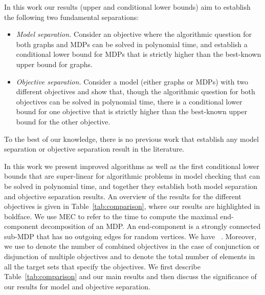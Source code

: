 \documentclass[11pt,letterpaper]{article}
\newif\iffullversion
\newcommand{\infull}[1]{\iffullversion #1\fi}
\begin{document}
\smallskip{} 
In this work our results (upper and conditional lower bounds) aim to establish 
the following two fundamental separations:

\begin{itemize}
\item {\em Model separation.} 
Consider an objective where the algorithmic question for both graphs and MDPs 
can be solved in polynomial time, and establish a conditional lower bound for 
MDPs that is strictly higher than the best-known upper bound for graphs. 
\infull{In other words, the conditional lower bound would separate the model of 
graphs and MDPs for problems (i.e., w.r.t.\ the objective) that can be solved in 
polynomial time.}

\item {\em Objective separation.} 
Consider a model (either graphs or MDPs) with two different objectives and 
show that, though the algorithmic question for both objectives can be solved in 
polynomial time, there is a conditional lower bound for one objective that 
is strictly higher than the best-known upper bound for the other objective.
\infull{In other words, the conditional lower bound would separate the two objectives 
w.r.t.\ the model though they both can be solved in polynomial time.}
\end{itemize}
To the best of our knowledge, there is no previous work that establish any 
model separation or objective separation result in the literature.

\smallskip{} 
In this work we present improved algorithms as well as 
the first conditional lower bounds that are super-linear for algorithmic 
problems in model checking that can be solved in polynomial time, and together
they establish both model separation and objective separation results. 
An overview of the results for the different objectives is given in Table~\ref{tab:comparison},
where our results are highlighted in boldface.
We use  
\textsc{MEC} to refer to the time to compute the maximal end-component 
decomposition of an MDP. An end-component is a\infull{ (non-trivial)}
strongly connected sub-MDP
that has no outgoing edges for random vertices. We have ~\cite{ChatterjeeH14}\infull{ and assume  
and }.
Moreover, we use 
 to denote the number of combined objectives in the case of conjunction 
or disjunction of multiple objectives and 
 to denote the total number of elements in all the target sets
that specify the objectives.
We first describe Table~\ref{tab:comparison} and our main results and then 
discuss the significance of our results for model and objective separation.
\end{document}
